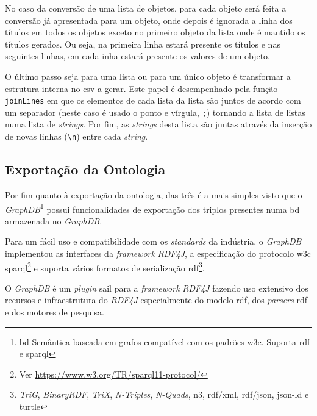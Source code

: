 No caso da conversão de uma lista de objetos, para cada objeto será feita a conversão já apresentada para um objeto, onde depois é ignorada a linha dos títulos em todos os objetos exceto no primeiro objeto da lista onde é mantido os títulos gerados. Ou seja, na primeira linha estará presente os títulos e nas seguintes linhas, em cada inha estará presente os valores de um objeto.

O último passo seja para uma lista ou para um único objeto é transformar a estrutura interna no \acrshort{csv} a gerar. Este papel é desempenhado pela função \texttt{joinLines} em que os elementos de cada lista da lista são juntos de acordo com um separador (neste caso é usado o ponto e vírgula, \texttt{;}) tornando a lista de listas numa lista de \textit{strings}. Por fim, as \textit{strings} desta lista são juntas através da inserção de novas linhas (\texttt{\textbackslash{}n}) entre cada \textit{string}.

\subsection{Exportação da Ontologia}
Por fim quanto à exportação da ontologia, das três é a mais simples visto que o \textit{GraphDB}\footnote{\acrfull{bd} Semântica baseada em grafos compatível com os padrões \acrshort{w3c}. Suporta \acrshort{rdf} e \acrshort{sparql}} possui funcionalidades de exportação dos triplos presentes numa \acrshort{bd} armazenada no \textit{GraphDB}.

Para um fácil uso e compatibilidade com os \textit{standards} da indústria, o \textit{GraphDB} implementou as interfaces da \textit{framework} \textit{RDF4J}, a especificação do protocolo \acrshort{w3c} \acrshort{sparql}\footnote{Ver \url{https://www.w3.org/TR/sparql11-protocol/}} e suporta vários formatos de serialização \acrshort{rdf}\footnote{\label{fnRDF}\textit{TriG}, \textit{BinaryRDF}, \textit{TriX}, \textit{N-Triples}, \textit{N-Quads}, \acrshort{n3}, \acrshort{rdf}/\acrshort{xml}, \acrshort{rdf}/\acrshort{json}, \acrshort{json-ld} e \acrshort{turtle}}.~\cite{graphdbAbout}

O \textit{GraphDB} é um \textit{plugin} \acrshort{sail} para a \textit{framework} \textit{RDF4J} fazendo uso extensivo dos recursos e infraestrutura do \textit{RDF4J} especialmente do modelo \acrshort{rdf}, dos \textit{parsers} \acrshort{rdf} e dos motores de pesquisa.~\cite{graphdbArch}

